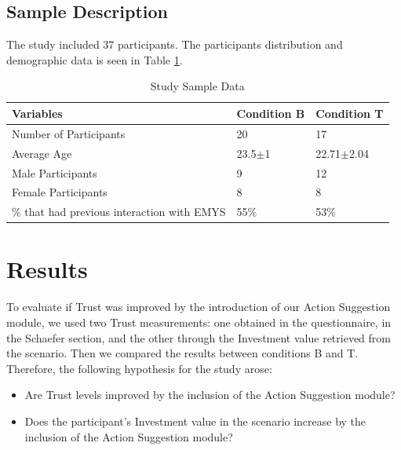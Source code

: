 \subsection{Sample Description}
The study included 37 participants. The participants distribution and demographic data is seen in Table \ref{tbl:SampleData}.

\begin{table}[h]
    \centering
    \begin{tabular}{|l|l|l|}
        \hline
        \textbf{Variables}                              &  \textbf{Condition B}     & \textbf{Condition T}  \\ \hline
        Number of Participants                          &  20                       & 17                    \\ \hline
        Average Age                                     &  23.5$\pm$1               & 22.71$\pm$2.04        \\ \hline
        Male Participants                               &  9                        & 12           \\ \hline
        Female Participants                             &  8                        & 8             \\ \hline
        \% that had previous interaction with EMYS      &  55\%                     & 53\%          \\ \hline
    \end{tabular}
    \caption{Study Sample Data}
    \label{tbl:SampleData}
\end{table}

\section{Results}
To evaluate if Trust was improved by the introduction of our Action Suggestion module, we used two Trust measurements: one obtained in the questionnaire, in the Schaefer section, and the other through the Investment value retrieved from the scenario. Then we compared the results between conditions B and T. Therefore, the following hypothesis for the study arose:

\begin{itemize}
    \item Are Trust levels improved by the inclusion of the Action Suggestion module?
    \item Does the participant's Investment value in the scenario increase by the inclusion of the Action Suggestion module?
\end{itemize}

